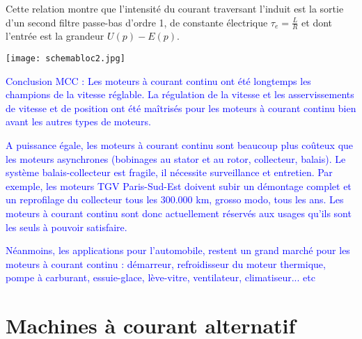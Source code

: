 \documentclass[12pt,prb,aps,epsf]{article}
\begin{document}
Cette relation montre que l'intensité du courant traversant l'induit est la sortie d'un second filtre passe-bas d'ordre 1, de constante électrique $\tau_e = \frac{L}{R}$ et dont l'entrée est la grandeur $U(p) - E(p)$.

\begin{center}
    \texttt{[image: schemabloc2.jpg]}
\end{center}


\textcolor{blue}{Conclusion MCC : Les moteurs à courant continu ont été longtemps les champions de la vitesse réglable. La régulation de la vitesse et les asservissements de vitesse et de position ont été maîtrisés pour les moteurs à courant continu bien avant les autres types de moteurs.}\medskip

\textcolor{blue}{A puissance égale, les moteurs à courant continu sont beaucoup plus coûteux que les moteurs asynchrones (bobinages au stator et au rotor, collecteur, balais). Le système balais-collecteur est fragile, il nécessite surveillance et entretien. Par exemple, les moteurs TGV Paris-Sud-Est doivent subir un démontage complet et un reprofilage du collecteur tous les $300.000$ km, grosso modo, tous les ans. Les moteurs à courant continu sont donc actuellement réservés aux usages qu'ils sont les seuls à pouvoir satisfaire.}\medskip

\textcolor{blue}{Néanmoins, les applications pour l'automobile, restent un grand marché pour les moteurs à courant continu : démarreur, refroidisseur du moteur thermique, pompe à carburant, essuie-glace, lève-vitre, ventilateur, climatiseur... etc}\medskip






\section{Machines à courant alternatif}


\end{document}
